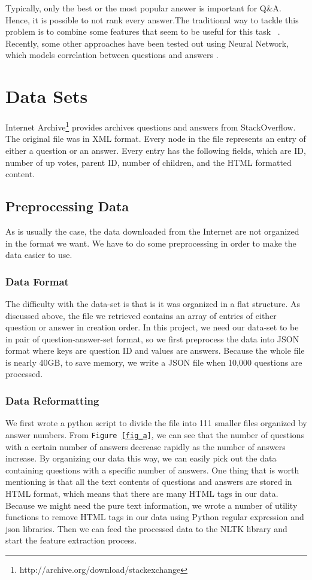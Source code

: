 \documentclass[11pt]{article}
\begin{document}
Typically, only the best or the most popular answer is important for Q\&A. Hence, it is possible to not rank every answer.The traditional way to tackle this problem is to combine some features that seem to be useful for this task ~\cite{Surdeanu2011}. Recently, some other approaches have been tested out using Neural Network, which models correlation between questions and answers \cite{Tan2015,Qiu2015}.

\section{Data Sets}

Internet Archive\footnote{\small http://archive.org/download/stackexchange} provides archives questions and answers from StackOverflow. The original file  was in XML format. Every node in the file represents an entry of either a question or an answer. Every entry has the following fields, which are ID, number of up votes, parent ID, number of children, and the HTML formatted content. 

\subsection{Preprocessing Data}
As is usually the case, the data downloaded from the Internet are not organized in the format we want. We have to do some preprocessing in order to make the data easier to use. 
\subsubsection{Data Format}
The difficulty with the data-set is that is it was organized in a flat structure. As discussed above, the file we retrieved contains an array of entries of either question or answer in creation order. In this project, we need our data-set to be in pair of question-answer-set format, so we first preprocess the data into JSON format where keys are question ID and values are answers. Because the whole file is nearly 40GB, to save memory, we write a JSON file when 10,000 questions are processed.
\subsubsection{Data Reformatting}
We first wrote a python script to divide the file into 111 smaller files organized by answer numbers. From \texttt{Figure \ref{fig_a}}, we can see that the number of questions with a certain number of answers decrease rapidly as the number of answers increase. By organizing our data this way, we can easily pick out the data containing questions with a specific number of answers. One thing that is worth mentioning is that all the text contents of questions and answers are stored in HTML format, which means that there are many HTML tags in our data. Because we might need the pure text information, we wrote a number of utility functions to remove HTML tags in our data using Python regular expression and json libraries. Then we can feed the processed data to the NLTK library and start the feature extraction process.
\end{document}
